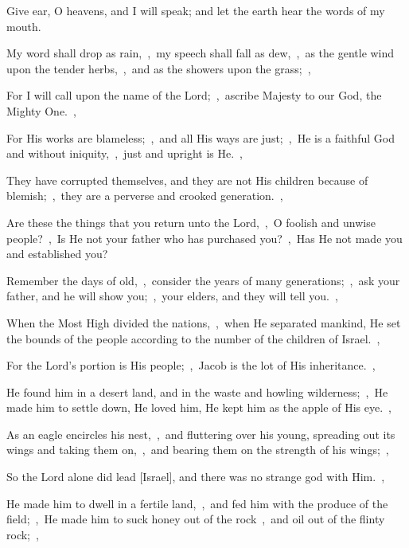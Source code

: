 \documentclass[12pt,twoside,a5paper]{article}
\begin{document}
\begin{normalparskip}
  Give ear, O heavens, and I will speak; and let the earth hear the words of my mouth.


  My word shall drop as rain,~\sep\ my speech shall fall as dew,~\sep\ as the gentle wind upon the tender herbs,~\sep\ and as the showers upon the grass;~\sep

  For I will call upon the name of the Lord;~\sep\ ascribe Majesty to our God, the Mighty One.~\sep

  For His works are blameless;~\sep\ and all His ways are just;~\sep\ He is a faithful God and without iniquity,~\sep\ just and upright is He.~\sep

  They have corrupted themselves, and they are not His children because of blemish;~\sep\ they are a perverse and crooked generation.~\sep

  Are these the things that you return unto the Lord,~\sep\ O foolish and unwise people?~\sep\ Is He not your father who has purchased you?~\sep\ Has He not made you and established you?

  Remember the days of old,~\sep\ consider the years of many generations;~\sep\ ask your father, and he will show you;~\sep\ your elders, and they will tell you.~\sep

  When the Most High divided the nations,~\sep\ when He separated mankind, He set the bounds of the people according to the number of the children of Israel.~\sep

  For the Lord's portion is His people;~\sep\ Jacob is the lot of His inheritance.~\sep

  He found him in a desert land, and in the waste and howling wilderness;~\sep\ He made him to settle down, He loved him, He kept him as the apple of His eye.~\sep

  As an eagle encircles his nest,~\sep\ and fluttering over his young, spreading out its wings and taking them on,~\sep\ and bearing them on the strength of his wings;~\sep

  So the Lord alone did lead [Israel], and there was no strange god with Him.~\sep

  He made him to dwell in a fertile land,~\sep\ and fed him with the produce of the field;~\sep\ He made him to suck honey out of the rock~\sep\ and oil out of the flinty rock;~\sep


\end{normalparskip}
\end{document}
